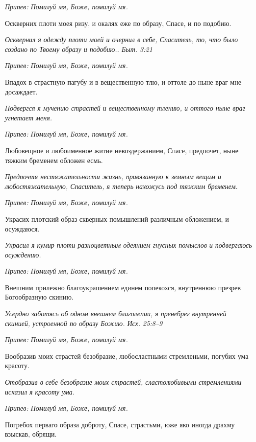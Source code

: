 \itshape Припев:\normalfont{} Помилуй мя, Боже, помилуй мя.


Оскверних плоти моея ризу, и окалях еже по образу, Спасе, и по подобию.


\itshape Осквернил я одежду плоти моей и очернил в себе, Спаситель, то, что было создано по Твоему образу и подобию.. Быт. 3:21\normalfont{}


\itshape Припев:\normalfont{} Помилуй мя, Боже, помилуй мя.


Впадох в страстную пагубу и в вещественную тлю, и оттоле до ныне враг мне досаждает.


\itshape Подвергся я мучению страстей и вещественному тлению, и оттого ныне враг угнетает меня.\normalfont{}


\itshape Припев:\normalfont{} Помилуй мя, Боже, помилуй мя.


Любовещное и любоименное житие невоздержанием, Спасе, предпочет, ныне тяжким бременем обложен есмь.


\itshape Предпочтя нестяжательности жизнь, привязанную к земным вещам и любостяжательную, Спаситель, я теперь нахожусь под тяжким бременем.\normalfont{}


\itshape Припев:\normalfont{} Помилуй мя, Боже, помилуй мя.


Украсих плотский образ скверных помышлений различным обложением, и осуждаюся.


\itshape Украсил я кумир плоти разноцветным одеянием гнусных помыслов и подвергаюсь осуждению.\normalfont{}


\itshape Припев:\normalfont{} Помилуй мя, Боже, помилуй мя.


Внешним прилежно благоукрашением единем попекохся, внутреннюю презрев Богообразную скинию.


\itshape Усердно заботясь об одном внешнем благолепии, я пренебрег внутренней скинией, устроенной по образу Божию. Исх. 25:8–9\normalfont{}


\itshape Припев:\normalfont{} Помилуй мя, Боже, помилуй мя.


Вообразив моих страстей безобразие, любосластными стремленьми, погубих ума красоту.


\itshape Отобразив в себе безобразие моих страстей, сластолюбивыми стремлениями исказил я красоту ума.\normalfont{}


\itshape Припев:\normalfont{} Помилуй мя, Боже, помилуй мя.


Погребох перваго образа доброту, Спасе, страстьми, юже яко иногда драхму взыскав, обрящи.


